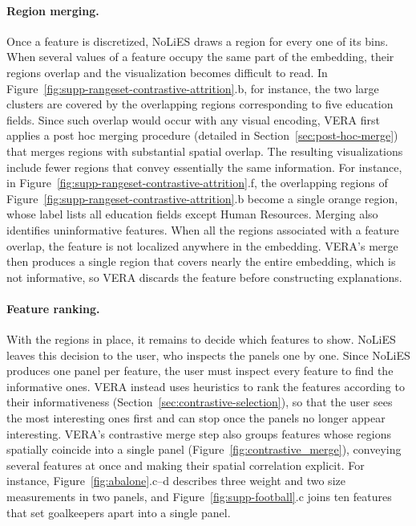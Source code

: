 \documentclass[10pt]{article}
\begin{document}
\paragraph{Region merging.}
Once a feature is discretized, NoLiES draws a region for every one of its bins. When several values of a feature occupy the same part of the embedding, their regions overlap and the visualization becomes difficult to read. In Figure~\ref{fig:supp-rangeset-contrastive-attrition}.b, for instance, the two large clusters are covered by the overlapping regions corresponding to five education fields.
Since such overlap would occur with any visual encoding, VERA first applies a post hoc merging procedure (detailed in Section~\ref{sec:post-hoc-merge}) that merges regions with substantial spatial overlap. The resulting visualizations include fewer regions that convey essentially the same information.
For instance, in Figure~\ref{fig:supp-rangeset-contrastive-attrition}.f, the overlapping regions of Figure~\ref{fig:supp-rangeset-contrastive-attrition}.b become a single orange region, whose label lists all education fields except Human Resources.
Merging also identifies uninformative features. When all the regions associated with a feature overlap, the feature is not localized anywhere in the embedding. VERA's merge then produces a single region that covers nearly the entire embedding, which is not informative, so VERA discards the feature before constructing explanations.

\paragraph{Feature ranking.}
With the regions in place, it remains to decide which features to show.
NoLiES leaves this decision to the user, who inspects the panels one by one. Since NoLiES produces one panel per feature, the user must inspect every feature to find the informative ones.
VERA instead uses heuristics to rank the features according to their informativeness (Section~\ref{sec:contrastive-selection}), so that the user sees the most interesting ones first and can stop once the panels no longer appear interesting.
VERA's contrastive merge step also groups features whose regions spatially coincide into a single panel (Figure~\ref{fig:contrastive_merge}), conveying several features at once and making their spatial correlation explicit.
For instance, Figure~\ref{fig:abalone}.c--d describes three weight and two size measurements in two panels, and Figure~\ref{fig:supp-football}.c joins ten features that set goalkeepers apart into a single panel.
\end{document}
